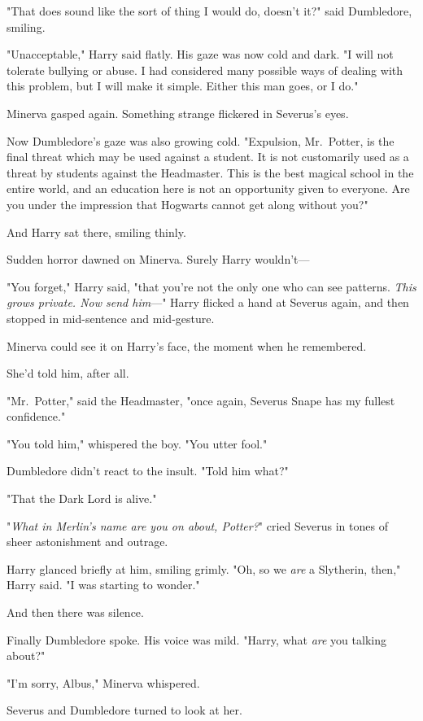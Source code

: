 "That does sound like the sort of thing I would do, doesn't it?" said
Dumbledore, smiling.

"Unacceptable," Harry said flatly. His gaze was now cold and dark. "I will not
tolerate bullying or abuse. I had considered many possible ways of dealing with
this problem, but I will make it simple. Either this man goes, or I do."

Minerva gasped again. Something strange flickered in Severus's eyes.

Now Dumbledore's gaze was also growing cold. "Expulsion, Mr.~Potter, is the
final threat which may be used against a student. It is not customarily used as
a threat by students against the Headmaster. This is the best magical school in
the entire world, and an education here is not an opportunity given to
everyone. Are you under the impression that Hogwarts cannot get along without
you?"

And Harry sat there, smiling thinly.

Sudden horror dawned on Minerva. Surely Harry wouldn't\mbox{---}

"You forget," Harry said, "that you're not the only one who can see patterns.
\emph{This grows private. Now send him}\mbox{---}" Harry flicked a hand at Severus
again, and then stopped in mid-sentence and mid-gesture.

Minerva could see it on Harry's face, the moment when he remembered.

She'd told him, after all.

"Mr.~Potter," said the Headmaster, "once again, Severus Snape has my fullest
confidence."

"You told him," whispered the boy. "You utter fool."

Dumbledore didn't react to the insult. "Told him what?"

"That the Dark Lord is alive."

"\emph{What in Merlin's name are you on about, Potter?}" cried Severus in tones
of sheer astonishment and outrage.

Harry glanced briefly at him, smiling grimly. "Oh, so we \emph{are} a
Slytherin, then," Harry said. "I was starting to wonder."

And then there was silence.

Finally Dumbledore spoke. His voice was mild. "Harry, what \emph{are} you
talking about?"

"I'm sorry, Albus," Minerva whispered.

Severus and Dumbledore turned to look at her.

